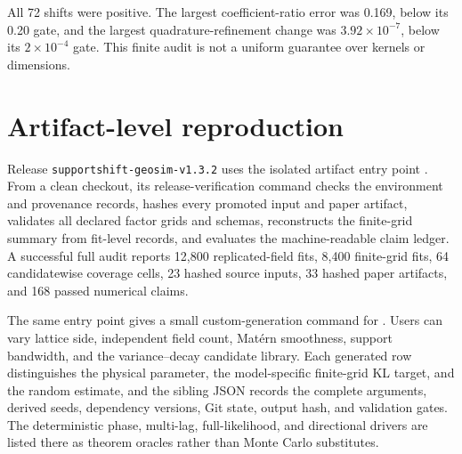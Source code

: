 \documentclass[sigconf]{acmart}
\theoremstyle{remark}
\begin{document}
All 72 shifts were positive. The largest coefficient-ratio error was 0.169,
below its 0.20 gate, and the largest quadrature-refinement change was
\(3.92\times10^{-7}\), below its \(2\times10^{-4}\) gate. This finite audit is
not a uniform guarantee over kernels or dimensions.

\section{Artifact-level reproduction}
\label{app:artifact-reproduction}

Release \texttt{supportshift-geosim-v1.3.2} uses the isolated artifact entry
point . From a clean checkout, its
release-verification command checks the environment and
provenance records, hashes every promoted input and paper artifact, validates
all declared factor grids and schemas, reconstructs the finite-grid summary
from fit-level records, and evaluates the machine-readable claim ledger. A
successful full audit reports 12,800 replicated-field fits, 8,400 finite-grid
fits, 64 candidatewise coverage cells, 23 hashed source inputs, 33 hashed paper
artifacts, and 168 passed numerical claims.

The same entry point gives a small custom-generation command for
. Users can vary lattice side, independent
field count, Mat\'ern smoothness, support bandwidth, and the variance--decay
candidate library. Each generated row distinguishes the physical parameter,
the model-specific finite-grid KL target, and the random estimate, and the
sibling JSON records the complete arguments, derived seeds, dependency
versions, Git state, output hash, and validation gates. The deterministic
phase, multi-lag, full-likelihood, and directional drivers are listed there as
theorem oracles rather than Monte Carlo substitutes.
\end{document}
